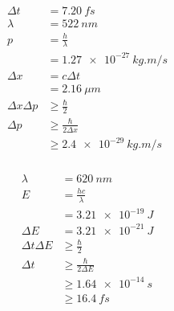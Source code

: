\documentclass{article}
\begin{document}
\setcounter{subsubsection}{22}
\subsubsection{}

\begin{align*}
  \Delta t          & = \qty{7.20}{fs}             \\
  \lambda           & = \qty{522}{nm}              \\
  p                 & = \frac{h}{\lambda}          \\
                    & = \qty{1.27e-27}{kg.m/s}     \\
  \Delta x          & = c \Delta t                 \\
                    & = \qty{2.16}{\mu m}          \\
  \Delta x \Delta p & \ge \frac{\hbar}{2}          \\
  \Delta p          & \ge \frac{\hbar}{2 \Delta x} \\
                    & \ge \qty{2.4e-29}{kg.m/s}
\end{align*}

\setcounter{subsubsection}{24}
\subsubsection{}

\begin{align*}
  \lambda           & = \qty{620}{nm}              \\
  E                 & = \frac{h c}{\lambda}        \\
                    & = \qty{3.21e-19}{J}          \\
  \Delta E          & = \qty{3.21e-21}{J}          \\
  \Delta t \Delta E & \ge \frac{\hbar}{2}          \\
  \Delta t          & \ge \frac{\hbar}{2 \Delta E} \\
                    & \ge \qty{1.64e-14}{s}        \\
                    & \ge \qty{16.4}{fs}
\end{align*}

\setcounter{subsubsection}{26}
\subsubsection{}
\end{document}
